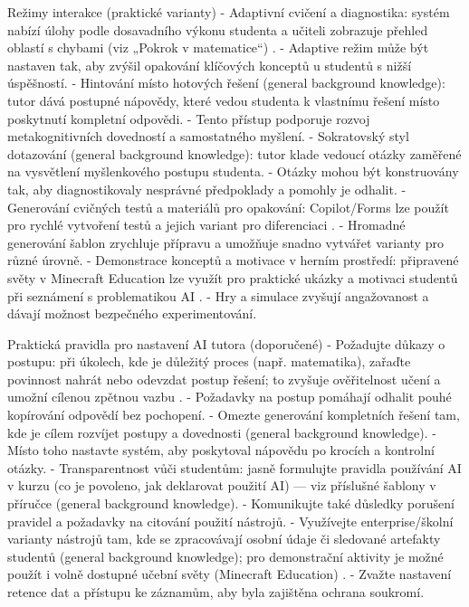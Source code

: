 \documentclass{report}%
\begin{document}
Režimy interakce (praktické varianty)
- Adaptivní cvičení a diagnostika: systém nabízí úlohy podle dosavadního výkonu studenta a učiteli zobrazuje přehled oblastí s chybami (viz „Pokrok v matematice“) \cite{kb_ai_101_tipu_pdf_04e4a115_page_8_1}.
- Adaptive režim může být nastaven tak, aby zvýšil opakování klíčových konceptů u studentů s nižší úspěšností.
- Hintování místo hotových řešení (general background knowledge): tutor dává postupné nápovědy, které vedou studenta k vlastnímu řešení místo poskytnutí kompletní odpovědi.
- Tento přístup podporuje rozvoj metakognitivních dovedností a samostatného myšlení.
- Sokratovský styl dotazování (general background knowledge): tutor klade vedoucí otázky zaměřené na vysvětlení myšlenkového postupu studenta.
- Otázky mohou být konstruovány tak, aby diagnostikovaly nesprávné předpoklady a pomohly je odhalit.
- Generování cvičných testů a materiálů pro opakování: Copilot/Forms lze použít pro rychlé vytvoření testů a jejich variant pro diferenciaci \cite{kb_ai_101_tipu_pdf_04e4a115_page_36_1}.
- Hromadné generování šablon zrychluje přípravu a umožňuje snadno vytvářet varianty pro různé úrovně.
- Demonstrace konceptů a motivace v herním prostředí: připravené světy v Minecraft Education lze využít pro praktické ukázky a motivaci studentů při seznámení s problematikou AI \cite{kb_ai_101_tipu_pdf_04e4a115_page_15_2}.
- Hry a simulace zvyšují angažovanost a dávají možnost bezpečného experimentování.

Praktická pravidla pro nastavení AI tutora (doporučené)
- Požadujte důkazy o postupu: při úkolech, kde je důležitý proces (např. matematika), zařaďte povinnost nahrát nebo odevzdat postup řešení; to zvyšuje ověřitelnost učení a umožní cílenou zpětnou vazbu \cite{kb_ai_101_tipu_pdf_04e4a115_page_8_1}.
- Požadavky na postup pomáhají odhalit pouhé kopírování odpovědí bez pochopení.
- Omezte generování kompletních řešení tam, kde je cílem rozvíjet postupy a dovednosti (general background knowledge).
- Místo toho nastavte systém, aby poskytoval nápovědu po krocích a kontrolní otázky.
- Transparentnost vůči studentům: jasně formulujte pravidla používání AI v kurzu (co je povoleno, jak deklarovat použití AI) — viz příslušné šablony v příručce (general background knowledge).
- Komunikujte také důsledky porušení pravidel a požadavky na citování použití nástrojů.
- Využívejte enterprise/školní varianty nástrojů tam, kde se zpracovávají osobní údaje či sledované artefakty studentů (general background knowledge); pro demonstrační aktivity je možné použít i volně dostupné učební světy (Minecraft Education) \cite{kb_ai_101_tipu_pdf_04e4a115_page_15_2}.
- Zvažte nastavení retence dat a přístupu ke záznamům, aby byla zajištěna ochrana soukromí.
\end{document}
